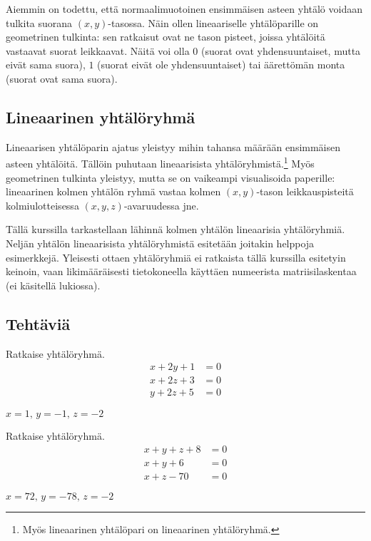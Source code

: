 Aiemmin on todettu, että normaalimuotoinen ensimmäisen asteen yhtälö voidaan tulkita suorana
$(x, y)$-tasossa. Näin ollen lineaariselle yhtälöparille on geometrinen tulkinta: sen
ratkaisut ovat ne tason pisteet, joissa yhtälöitä vastaavat
suorat leikkaavat. Näitä voi olla $0$ (suorat ovat yhdensuuntaiset,
mutta eivät sama suora), $1$ (suorat eivät ole yhdensuuntaiset) tai äärettömän monta (suorat ovat sama suora).


\subsection*{Lineaarinen yhtälöryhmä}

Lineaarisen yhtälöparin ajatus yleistyy mihin tahansa määrään ensimmäisen asteen yhtälöitä.
Tällöin puhutaan lineaarisista yhtälöryhmistä.\footnote{Myös lineaarinen yhtälöpari on lineaarinen yhtälöryhmä.}
Myös geometrinen tulkinta yleistyy, mutta se on vaikeampi visualisoida paperille:
lineaarinen kolmen yhtälön ryhmä vastaa kolmen $(x, y)$-tason leikkauspisteitä
kolmiulotteisessa $(x, y, z)$-avaruudessa jne.

Tällä kurssilla tarkastellaan lähinnä kolmen yhtälön lineaarisia yhtälöryhmiä. Neljän yhtälön
lineaarisista yhtälöryhmistä esitetään joitakin helppoja esimerkkejä. Yleisesti ottaen yhtälöryhmiä
ei ratkaista tällä kurssilla esitetyin keinoin, vaan likimääräisesti tietokoneella käyttäen numeerista 
matriisilaskentaa (ei käsitellä lukiossa).

\subsection*{Tehtäviä}

\begin{tehtava}
    Ratkaise yhtälöryhmä.
    \begin{align*}
        x+2y+1 &= 0 \\
        x+2z+3 &=0 \\
        y+2z+5 &=0
    \end{align*}
    \begin{vastaus}
        $x = 1, \, y = -1, \, z = -2$
    \end{vastaus}
\end{tehtava}

\begin{tehtava}
    Ratkaise yhtälöryhmä.
    \begin{align*}
        x+y+z+8 &= 0 \\
        x+y+6 &=0 \\
        x+z-70 &=0
    \end{align*}
    \begin{vastaus}
        $x = 72, \, y = -78, \, z = -2$
    \end{vastaus}
\end{tehtava}


